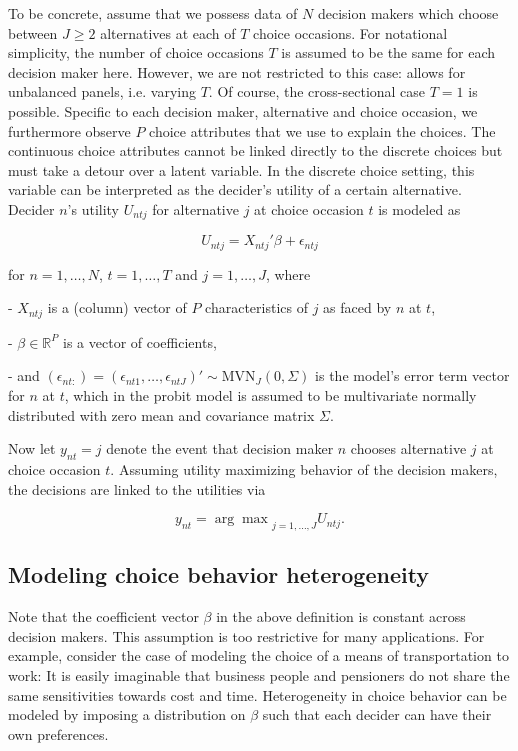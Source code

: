 \documentclass[article]{jss}
\begin{document}
To be concrete, assume that we possess data of $N$ decision makers which choose between $J \geq 2$ alternatives at each of $T$ choice occasions. For notational simplicity, the number of choice occasions $T$ is assumed to be the same for each decision maker here. However, we are not restricted to this case:  allows for unbalanced panels, i.e. varying $T$. Of course, the cross-sectional case $T = 1$ is possible. Specific to each decision maker, alternative and choice occasion, we furthermore observe $P$ choice attributes that we use to explain the choices. The continuous choice attributes cannot be linked directly to the discrete choices but must take a detour over a latent variable. In the discrete choice setting, this variable can be interpreted as the decider's utility of a certain alternative. Decider $n$'s utility $U_{ntj}$ for alternative $j$ at choice occasion $t$ is modeled as

\begin{equation}
  U_{ntj} = X_{ntj}'\beta + \epsilon_{ntj}
\end{equation}

for $n=1,\dots,N$, $t=1,\dots,T$ and $j=1,\dots,J$, where

- $X_{ntj}$ is a (column) vector of $P$ characteristics of $j$ as faced by $n$ at $t$,

- $\beta \in {\mathbb R}^{P}$ is a vector of coefficients,

- and $(\epsilon_{nt:}) = (\epsilon_{nt1},\dots,\epsilon_{ntJ})' \sim \text{MVN}_{J} (0,\Sigma)$ is the model's error term vector for $n$ at $t$, which in the probit model is assumed to be multivariate normally distributed with zero mean and covariance matrix $\Sigma$.

Now let $y_{nt}=j$ denote the event that decision maker $n$ chooses alternative $j$ at choice occasion $t$. Assuming utility maximizing behavior of the decision makers, the decisions are linked to the utilities via

\begin{equation}
y_{nt} = {\arg \max}_{j = 1,\dots,J} U_{ntj}.
\end{equation}

\subsection{Modeling choice behavior heterogeneity} \label{subsec:heterogeneity}

Note that the coefficient vector $\beta$ in the above definition is constant across decision makers. This assumption is too restrictive for many applications. For example, consider the case of modeling the choice of a means of transportation to work: It is easily imaginable that business people and pensioners do not share the same sensitivities towards cost and time. Heterogeneity in choice behavior can be modeled by imposing a distribution on $\beta$ such that each decider can have their own preferences.
\end{document}
